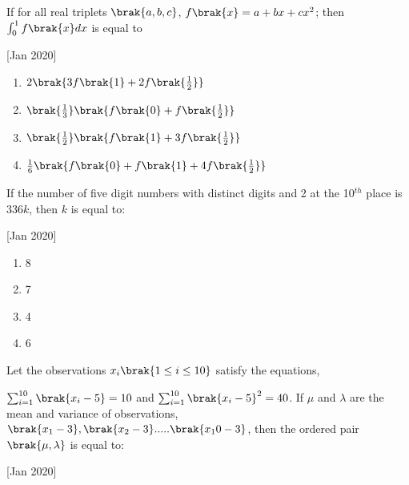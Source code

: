 \iffalse
	\title{2020}
	\author{AI24BTECH11003}
	\section{mcq-single}
\fi
 
    \item If for all real triplets $\brak{a, b, c}$, $f\brak{x}=a+bx+cx^2$; then $\int_0^1f\brak{x}dx$ is equal to
    
    \hfill[Jan 2020]

        \begin{multicols}{1}
            \begin{enumerate}
                \item $2\brak{3f\brak{1}+ 2f\brak{\frac{1}{2}}}$
                \item $\brak{\frac{1}{3}}\brak{f\brak{0}+f\brak{\frac{1}{2}}}$
                \item $\brak{\frac{1}{2}}\brak{f\brak{1}+3f\brak{\frac{1}{2}}}$
                \item ${\frac{1}{6}}\brak{f\brak{0}+f\brak{1}+4f\brak{\frac{1}{2}}}$
            \end{enumerate}
        \end{multicols}

    \item If the number of five digit numbers with distinct digits and 2 at the 10$^{th}$ place is $336k$, then $k$ is equal to:
    
    \hfill[Jan 2020]

		\begin{multicols}{4}
			\begin{enumerate}
				\item 8
				\item 7
				\item 4
				\item 6
			\end{enumerate}
		\end{multicols}

    \item Let the observations $x_i\brak{1\leq i \leq 10}$ satisfy the equations,

    $\sum_{i=1}^{10} \brak{x_i - 5}=10$
    and
    $\sum_{i=1}^{10} \brak{x_i-5}^2=40$.
    If $\mu$ and $\lambda$ are the mean and variance of observations, $\brak{x_1-3}, \brak{x_2-3}.....\brak{x_10-3}$, then the ordered pair $\brak{\mu, \lambda}$ is equal to:
    
    \hfill[Jan 2020]

